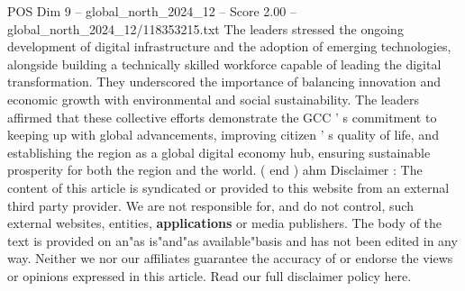 \begin{textsample}{POS Dim 9 – global\_north\_2024\_12 – Score 2.00 – global\_north\_2024\_12/118353215.txt}
The leaders stressed the ongoing development of digital infrastructure and the adoption of emerging technologies, alongside building a technically skilled workforce capable of leading the digital transformation.
They underscored the importance of balancing innovation and economic growth with environmental and social sustainability.
The leaders affirmed that these collective efforts demonstrate the GCC ' s commitment to keeping up with global advancements, improving citizen ' s quality of life, and establishing the region as a global digital economy hub, ensuring sustainable prosperity for both the region and the world. ( end ) ahm Disclaimer : The content of this article is syndicated or provided to this website from an external third party provider.
We are not responsible for, and do not control, such external websites, entities, \textbf{applications} or media publishers.
The body of the text is provided on an"as is"and"as available"basis and has not been edited in any way.
Neither we nor our affiliates guarantee the accuracy of or endorse the views or opinions expressed in this article.
Read our full disclaimer policy here.

\end{textsample}
